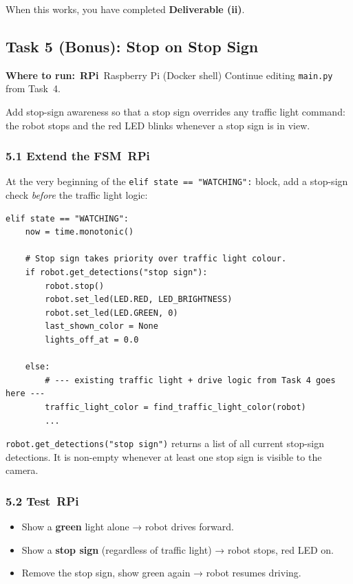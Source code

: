 \documentclass{ol-softwaremanual}
\newcommand{\onrpi}{%
  \,\colorbox{blue!20}{\footnotesize\sffamily\bfseries RPi}}
\newcommand{\machinebox}[2]{%
  \par\noindent
  \colorbox{gray!12}{\parbox{\dimexpr\linewidth-2\fboxsep}{%
    \small\sffamily\textbf{Where to run:} #1 \quad\textbar\quad #2}}%
  \par\smallskip}
\begin{document}
\noindent When this works, you have completed \textbf{Deliverable (ii)}.


\subsection{Task 5 (Bonus): Stop on Stop Sign}

\machinebox{\onrpi\ Raspberry Pi (Docker shell)}{Continue editing \texttt{main.py} from Task~4.}

Add stop-sign awareness so that a stop sign overrides any traffic light command:
the robot stops and the red LED blinks whenever a stop sign is in view.

\subsubsection*{5.1 Extend the FSM\onrpi}

At the very beginning of the \texttt{elif state == "WATCHING":} block, add a
stop-sign check \emph{before} the traffic light logic:

\begin{verbatim}
elif state == "WATCHING":
    now = time.monotonic()

    # Stop sign takes priority over traffic light colour.
    if robot.get_detections("stop sign"):
        robot.stop()
        robot.set_led(LED.RED, LED_BRIGHTNESS)
        robot.set_led(LED.GREEN, 0)
        last_shown_color = None
        lights_off_at = 0.0

    else:
        # --- existing traffic light + drive logic from Task 4 goes here ---
        traffic_light_color = find_traffic_light_color(robot)
        ...
\end{verbatim}

\texttt{robot.get\_detections("stop sign")} returns a list of all current
stop-sign detections.
It is non-empty whenever at least one stop sign is visible to the camera.

\subsubsection*{5.2 Test\onrpi}

\begin{itemize}
  \item Show a \textbf{green} light alone → robot drives forward.
  \item Show a \textbf{stop sign} (regardless of traffic light) → robot stops, red LED on.
  \item Remove the stop sign, show green again → robot resumes driving.
\end{itemize}
\end{document}

